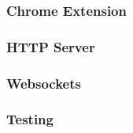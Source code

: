 \subsubsection{Chrome Extension}

\subsubsection{HTTP Server}


\subsubsection{Websockets}

\subsubsection{Testing}





